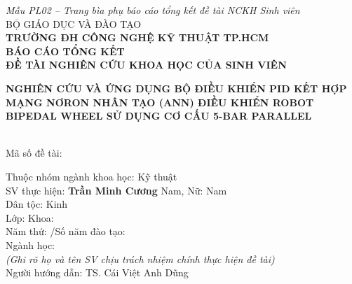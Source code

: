 \documentclass[13pt]{extreport}
\begin{document}
\begin{titlepage}
    \thispagestyle{empty}

    \centering
    \vspace*{0.4cm}

    {\small\itshape Mẫu PL02 -- Trang bìa phụ báo cáo tổng kết đề tài NCKH Sinh viên}\\[0.6cm]

    {\fontsize{13pt}{15pt}\selectfont BỘ GIÁO DỤC VÀ ĐÀO TẠO}\\[0.1cm]
    {\fontsize{14pt}{16pt}\selectfont\bfseries TRƯỜNG ĐH CÔNG NGHỆ KỸ THUẬT TP.HCM}\\[1cm]

    {\fontsize{16pt}{20pt}\selectfont\bfseries BÁO CÁO TỔNG KẾT}\\[0.4cm]
    {\fontsize{14pt}{17pt}\selectfont\bfseries ĐỀ TÀI NGHIÊN CỨU KHOA HỌC CỦA SINH VIÊN}\\[0.8cm]

    \parbox{12cm}{\centering\fontsize{14pt}{18pt}\selectfont\bfseries
    NGHIÊN CỨU VÀ ỨNG DỤNG BỘ ĐIỀU KHIỂN PID
    KẾT HỢP MẠNG NƠRON NHÂN TẠO (ANN)
    ĐIỀU KHIỂN ROBOT BIPEDAL WHEEL
    SỬ DỤNG CƠ CẤU 5-BAR PARALLEL
    }

    \\[0.4cm]

    {\fontsize{13pt}{15pt}\selectfont Mã số đề tài: \underline{\hspace{5cm}}}\\[0.8cm]

    \begin{flushleft}
    \setlength{\parskip}{5pt}
    {\fontsize{13pt}{15pt}\selectfont
        Thuộc nhóm ngành khoa học: Kỹ thuật\\[0.3cm]
        SV thực hiện: \textbf{Trần Minh Cương} \hfill Nam, Nữ: Nam\\
        Dân tộc: Kinh\\
        Lớp: \underline{\hspace{3.5cm}} \quad Khoa: \underline{\hspace{4.5cm}}\\
        Năm thứ: \underline{ \quad} /Số năm đào tạo: \underline{ \quad}\\
        Ngành học: \underline{\hspace{9cm}}\\[0.4cm]
        \textit{(Ghi rõ họ và tên SV chịu trách nhiệm chính thực hiện đề tài)}\\[0.5cm]
        Người hướng dẫn: TS. Cái Việt Anh Dũng
    }
    \end{flushleft}


\end{titlepage}
\end{document}
